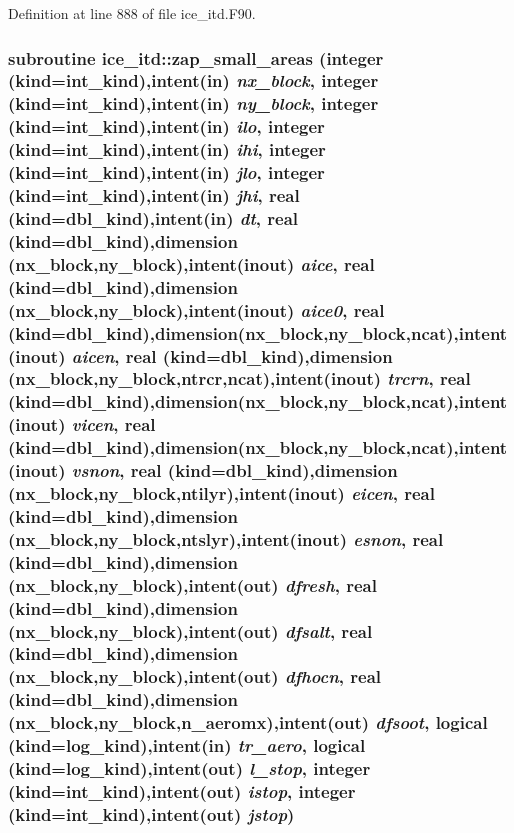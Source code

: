 Definition at line 888 of file ice\_\-itd.F90.\hypertarget{namespaceice__itd_a137780a223f20265133e26e9e96d36a5}{
\subsubsection[{zap\_\-small\_\-areas}]{\setlength{\rightskip}{0pt plus 5cm}subroutine ice\_\-itd::zap\_\-small\_\-areas (integer (kind=int\_\-kind),intent(in) {\em nx\_\-block}, \/  integer (kind=int\_\-kind),intent(in) {\em ny\_\-block}, \/  integer (kind=int\_\-kind),intent(in) {\em ilo}, \/  integer (kind=int\_\-kind),intent(in) {\em ihi}, \/  integer (kind=int\_\-kind),intent(in) {\em jlo}, \/  integer (kind=int\_\-kind),intent(in) {\em jhi}, \/  real (kind=dbl\_\-kind),intent(in) {\em dt}, \/  real (kind=dbl\_\-kind),dimension (nx\_\-block,ny\_\-block),intent(inout) {\em aice}, \/  real (kind=dbl\_\-kind),dimension (nx\_\-block,ny\_\-block),intent(inout) {\em aice0}, \/  real (kind=dbl\_\-kind),dimension(nx\_\-block,ny\_\-block,ncat),intent(inout) {\em aicen}, \/  real (kind=dbl\_\-kind),dimension (nx\_\-block,ny\_\-block,ntrcr,ncat),intent(inout) {\em trcrn}, \/  real (kind=dbl\_\-kind),dimension(nx\_\-block,ny\_\-block,ncat),intent(inout) {\em vicen}, \/  real (kind=dbl\_\-kind),dimension(nx\_\-block,ny\_\-block,ncat),intent(inout) {\em vsnon}, \/  real (kind=dbl\_\-kind),dimension (nx\_\-block,ny\_\-block,ntilyr),intent(inout) {\em eicen}, \/  real (kind=dbl\_\-kind),dimension (nx\_\-block,ny\_\-block,ntslyr),intent(inout) {\em esnon}, \/  real (kind=dbl\_\-kind),dimension (nx\_\-block,ny\_\-block),intent(out) {\em dfresh}, \/  real (kind=dbl\_\-kind),dimension (nx\_\-block,ny\_\-block),intent(out) {\em dfsalt}, \/  real (kind=dbl\_\-kind),dimension (nx\_\-block,ny\_\-block),intent(out) {\em dfhocn}, \/  real (kind=dbl\_\-kind),dimension (nx\_\-block,ny\_\-block,n\_\-aeromx),intent(out) {\em dfsoot}, \/  logical (kind=log\_\-kind),intent(in) {\em tr\_\-aero}, \/  logical (kind=log\_\-kind),intent(out) {\em l\_\-stop}, \/  integer (kind=int\_\-kind),intent(out) {\em istop}, \/  integer (kind=int\_\-kind),intent(out) {\em jstop})}}
\label{namespaceice__itd_a137780a223f20265133e26e9e96d36a5}


